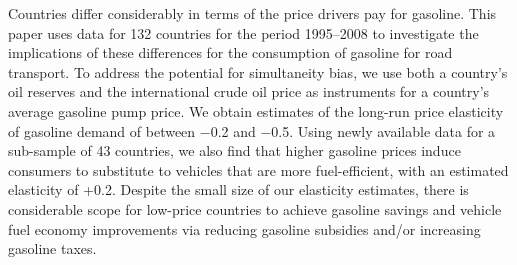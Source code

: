 Countries differ considerably in terms of the price drivers pay for gasoline. This paper uses data for 132 countries for the period 1995–2008 to investigate the implications of these differences for the consumption of gasoline for road transport. To address the potential for simultaneity bias, we use both a country's oil reserves and the international crude oil price as instruments for a country's average gasoline pump price. We obtain estimates of the long-run price elasticity of gasoline demand of between −0.2 and −0.5. Using newly available data for a sub-sample of 43 countries, we also find that higher gasoline prices induce consumers to substitute to vehicles that are more fuel-efficient, with an estimated elasticity of +0.2. Despite the small size of our elasticity estimates, there is considerable scope for low-price countries to achieve gasoline savings and vehicle fuel economy improvements via reducing gasoline subsidies and/or increasing gasoline taxes.
